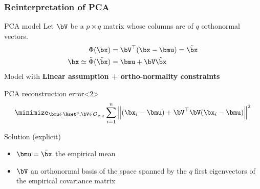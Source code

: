 \documentclass{beamer}\usepackage[]{graphicx}\usepackage[]{color}
\begin{document}
\begin{frame}
\frametitle{Reinterpretation of PCA}

  \begin{block}{PCA model}
       Let $\bV$ be a $p\times q$ matrix whose columns are of $q$ orthonormal vectors.
      \begin{align*}
        \Phi(\bx) & = \bV^\top(\bx-\bmu)  = \tilde\bx \\  
        \bx \simeq \tilde{\Phi}(\tilde\bx) & = \bmu + \bV \tilde\bx
      \end{align*}
      \rsa Model with \alert{\bf Linear assumption + ortho-normality constraints}
    \end{block}

  \begin{block}{PCA reconstruction error}<2>
    \vspace{-.25cm}
    \begin{equation*}
      \minimize_{\bmu \in\Rset^p, \bV\in\mathcal{O}_{p,q}} \sum_{i=1}^n \left\| (\bx_i  - \bmu) + \bV^\top\bV ( \bx_i -\bmu)   \right\|^2
    \end{equation*}
  
  \alert{Solution (explicit)} 
  \begin{itemize}
  \item $\bmu = \bar{\bx}$ the empirical mean
  \item $\bV$  an orthonormal basis of the space spanned by the $q$ first eigenvectors of the empirical covariance matrix
  \end{itemize}
  
  \end{block}
\end{frame}
\end{document}
